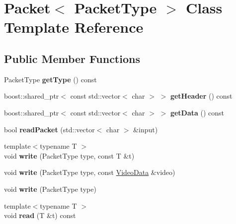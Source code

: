 \hypertarget{classPacket}{
\section{Packet$<$ PacketType $>$ Class Template Reference}
\label{classPacket}
}
\subsection*{Public Member Functions}
\begin{DoxyCompactItemize}
\item 
\hypertarget{classPacket_ad1c9f433dbc7a5ba43bbdff826fb1dd7}{
PacketType {\bfseries getType} () const }
\label{classPacket_ad1c9f433dbc7a5ba43bbdff826fb1dd7}

\item 
\hypertarget{classPacket_af688d0ad264f65b12c9cdc999218a828}{
boost::shared\_\-ptr$<$ const std::vector$<$ char $>$ $>$ {\bfseries getHeader} () const }
\label{classPacket_af688d0ad264f65b12c9cdc999218a828}

\item 
\hypertarget{classPacket_a96a63681049b3d47e2f0252336c8e6ef}{
boost::shared\_\-ptr$<$ const std::vector$<$ char $>$ $>$ {\bfseries getData} () const }
\label{classPacket_a96a63681049b3d47e2f0252336c8e6ef}

\item 
\hypertarget{classPacket_ae2b47f4d54170c708dd50edf95e167b7}{
bool {\bfseries readPacket} (std::vector$<$ char $>$ \&input)}
\label{classPacket_ae2b47f4d54170c708dd50edf95e167b7}

\item 
\hypertarget{classPacket_a95ca1c18efc8202f7cd4c46ffb89a4a8}{
{\footnotesize template$<$typename T $>$ }\\void {\bfseries write} (PacketType type, const T \&t)}
\label{classPacket_a95ca1c18efc8202f7cd4c46ffb89a4a8}

\item 
\hypertarget{classPacket_a42af3a3916922f11ab4bcc4f88ed959b}{
void {\bfseries write} (PacketType type, const \hyperlink{structVideoData}{VideoData} \&video)}
\label{classPacket_a42af3a3916922f11ab4bcc4f88ed959b}

\item 
\hypertarget{classPacket_a28002ec8b26d8d6affcabdcab11ba0a0}{
void {\bfseries write} (PacketType type)}
\label{classPacket_a28002ec8b26d8d6affcabdcab11ba0a0}

\item 
\hypertarget{classPacket_a0f40b9784dca6e16c6a64ee2d882e670}{
{\footnotesize template$<$typename T $>$ }\\void {\bfseries read} (T \&t) const }
\label{classPacket_a0f40b9784dca6e16c6a64ee2d882e670}


\end{DoxyCompactItemize}
